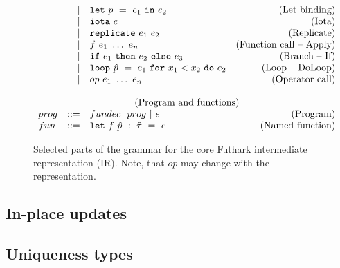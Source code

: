\begin{figure}
\begin{equation}
\begin{array}{lrlr}
& | & \mathtt{let}~p~=~e_1~\mathtt{in}~e_2 & \text{(Let binding)} \\
& | & \mathtt{iota}~e & \text{(Iota)} \\
& | & \mathtt{replicate}~e_1~e_2 & \text{(Replicate)} \\
& | & f~e_1~\dots~e_n & \text{(Function call -- Apply)} \\
& | & \mathtt{if}~e_1~\mathtt{then}~e_2~\mathtt{else}~e_3  & \text{(Branch -- If)} \\
& | & \mathtt{loop}~\hat{p}~=~e_1~\mathtt{for}~x_1<x_2~\mathtt{do}~e_2 & \text{(Loop -- DoLoop)} \\
& | & op~e_1~\dots~e_n & \text{(Operator call)} \\
\\
\multicolumn{4}{c}{\text{(Program and functions)}} \\
prog & ::= & fundec~~prog~|~\epsilon & \text{(Program)} \\
fun & ::= & \mathtt{let}~f~\hat{p}~:~\hat{\tau}~=~e& \text{(Named function)}
\end{array}
\end{equation}
\caption{Selected parts of the grammar for the core Futhark
  intermediate representation (IR). Note, that $op$ may
  change with the representation.}
\label{fig:futhark_core}
\end{figure}
%

\subsection{In-place updates}
\subsection{Uniqueness types}

